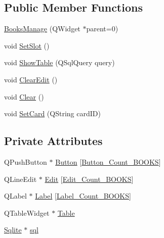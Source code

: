 \subsection*{Public Member Functions}
\begin{DoxyCompactItemize}
\item 
\mbox{\hyperlink{class_books_manage_adc44f2312ab4d2cd48868ff923fa8861}{Books\+Manage}} (Q\+Widget $\ast$parent=0)
\item 
void \mbox{\hyperlink{class_books_manage_a0ee0a3e432c7789497c17758d1f82fdf}{Set\+Slot}} ()
\item 
void \mbox{\hyperlink{class_books_manage_abbacf5e112bdee769aaa4d22c0e14744}{Show\+Table}} (Q\+Sql\+Query query)
\item 
void \mbox{\hyperlink{class_books_manage_aa5b813a7fb68aa61a143f84c87699c83}{Clear\+Edit}} ()
\item 
void \mbox{\hyperlink{class_books_manage_a8388b6b8547cc759a9976c1a567aab0a}{Clear}} ()
\item 
void \mbox{\hyperlink{class_books_manage_a009c231a6f8976be927b7acfdc4d4591}{Set\+Card}} (Q\+String card\+ID)
\end{DoxyCompactItemize}
\subsection*{Private Attributes}
\begin{DoxyCompactItemize}
\item 
Q\+Push\+Button $\ast$ \mbox{\hyperlink{class_books_manage_ad6d2668953bb202a37237227a97945b6}{Button}} \mbox{[}\mbox{\hyperlink{booksmanage_8h_a1f031c616a6edfa38e89dfb16a4f5a5e}{Button\+\_\+\+Count\+\_\+\+B\+O\+O\+KS}}\mbox{]}
\item 
Q\+Line\+Edit $\ast$ \mbox{\hyperlink{class_books_manage_aac41c654721ef320dd30c96cd7d5ec6c}{Edit}} \mbox{[}\mbox{\hyperlink{booksmanage_8h_a37e6a98d7cb44866bfdff08467fbbab1}{Edit\+\_\+\+Count\+\_\+\+B\+O\+O\+KS}}\mbox{]}
\item 
Q\+Label $\ast$ \mbox{\hyperlink{class_books_manage_ae5229988ac3199d79f55e0fd96439bd3}{Label}} \mbox{[}\mbox{\hyperlink{booksmanage_8h_a575ef603f6be7bd11518983b660df624}{Label\+\_\+\+Count\+\_\+\+B\+O\+O\+KS}}\mbox{]}
\item 
Q\+Table\+Widget $\ast$ \mbox{\hyperlink{class_books_manage_a0c82c7e6c92bc699d5f59af1e8a81d7a}{Table}}
\item 
\mbox{\hyperlink{class_sqlite}{Sqlite}} $\ast$ \mbox{\hyperlink{class_books_manage_a081e78f1eccbf607c3874a6c8c714983}{sql}}
\end{DoxyCompactItemize}


